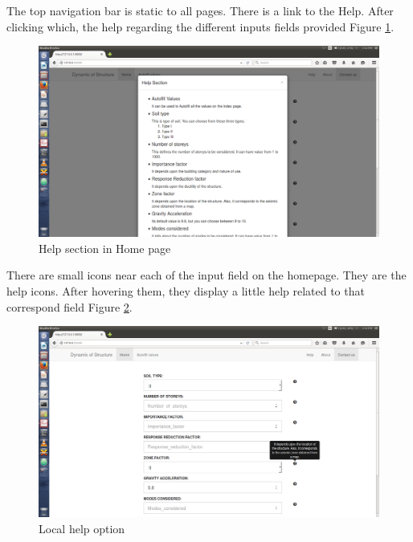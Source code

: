 The top navigation bar is static to all pages. There is a link to the Help. 
After clicking which, the help regarding the different inputs fields 
provided Figure \ref{fig:3}.

\begin{figure}[H] 
\centering \includegraphics[scale=0.31]{images/output/3.png}
\caption{Help section in Home page}
\label{fig:3}
\end{figure}

There are small icons near each of the input field on the homepage. They are 
the help icons. After hovering them, they display a little help related to
that correspond field Figure \ref{fig:4}.
\begin{figure}[H] 
\centering \includegraphics[scale=0.31]{images/output/4.png}
\caption{Local help option}
\label{fig:4}
\end{figure}

